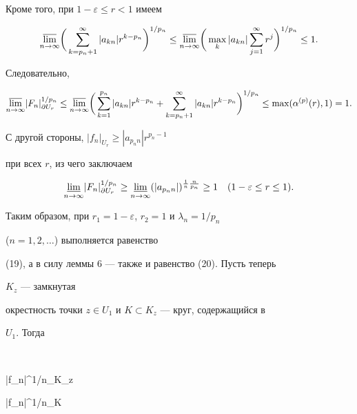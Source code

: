 Кроме того, при $1-\varepsilon\le r<1$ имеем 


$$ 


\underset{n\to\infty}{\varlimsup}{}\bigg( 


\sum^\infty_{k=p_n+1}|a_{kn}|r^{k-p_n}\bigg)^{1/p_n}\le 


\underset{n\to\infty}{\varlimsup}{}\bigg(\max_k|a_{kn}| 


\sum^\infty_{j=1}r^j\bigg)^{1/p_n}\le1. 


$$ 


Следовательно, 


$$ 


\underset{n\to\infty}{\varlimsup}{}|F_n|^{1/p_n}_{\partial U_r}\le 


\underset{n\to\infty}{\varlimsup}{}\bigg( 


\sum^{p_n}_{k=1}|a_{kn}|r^{k-p_n}+ 


\sum^\infty_{k=p_n+1}|a_{kn}|r^{k-p_n}\bigg)^{1/p_n} 


\le\max(\alpha^{(p)}(r),1)=1. 


$$ 


С другой стороны, $|f_n|_{U_r}\ge|a_{p_n n}|r^{p_n-1}$ 


при всех $r$, из чего заключаем 


\begin{equation} 


\underset{n\to\infty}{\varliminf}{}|F_n|^{1/p_n}_{\partial U_r}\ge 


\underset{n\to\infty}{\varliminf}{}(|a_{p_n n}| 


)^{\frac{1}{n}\frac{n}{p_n}}\ge1\quad 


(1-\varepsilon\le r\le 1). 


\end{equation} 


Таким образом, при $r_1=1-\varepsilon$, $r_2=1$ и $\lambda_n=1/p_n$ 


($n=1,2,\dotsc$) выполняется равенство 


(19), а в силу леммы 6 --- также и равенство (20). Пусть теперь 


$K_z$ --- замкнутая 


окрестность точки $z\in U_1$ и $K\subset K_z$ --- круг, содержащийся в 


$U_1$. Тогда 


$$ 


|f_n|^{1/n}_{K_z}\ge 


|f_n|^{1/n}_K\ge 


